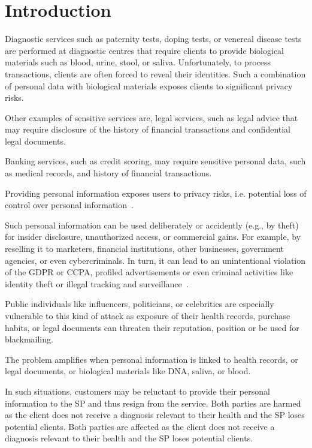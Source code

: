 \section{Introduction}
\label{sec:introduction}
Diagnostic services such as paternity tests, doping tests, or venereal disease tests are performed at diagnostic centres that require clients to provide biological materials such as blood, urine, stool, or saliva. Unfortunately, to process transactions, clients are often forced to reveal their identities. Such a combination of personal data with biological materials exposes clients to significant privacy risks.

Other examples of sensitive services are, legal services, such as legal advice that may require disclosure of the history of financial transactions and confidential legal documents.

Banking services, such as credit scoring, may require sensitive personal data, such as medical records, and history of financial transactions.

Providing personal information exposes users to privacy risks, i.e. potential loss of control over personal information~\cite{smithInformationPrivacyResearch2011}.

Such personal information can be used deliberately or accidently (e.g., by theft) 
for insider disclosure, unauthorized access, or commercial gains. For example, by reselling it to marketers, financial institutions, other businesses, government agencies, or even cybercriminals. 
In turn, it can lead to an unintentional violation of the GDPR or CCPA, profiled advertisements or even criminal activities like identity theft or illegal tracking and surveillance~\cite{smithInformationPrivacyResearch2011}.

Public individuals like influencers, politicians, or celebrities are especially vulnerable to this kind of attack as exposure of their health records, purchase habits, or legal documents can threaten their reputation, position or be used for blackmailing.

The problem amplifies when personal information is linked to health records, or legal documents, or biological materials like DNA, saliva, or blood.

In such situations, customers may be reluctant to provide their personal information to the SP and thus resign from the service. Both parties are harmed as the client does not receive a diagnosis relevant to their health and the SP loses potential clients. Both parties are affected as the client does not receive a diagnosis relevant to their health and the SP loses potential clients.

